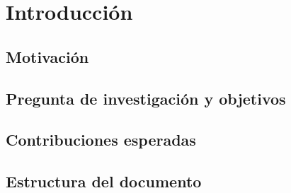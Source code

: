 \chapter{Introducción}\label{cap:introduccion}


\section{Motivación}

\section{Pregunta de investigación y objetivos}

\section{Contribuciones esperadas}

\section{Estructura del documento}
